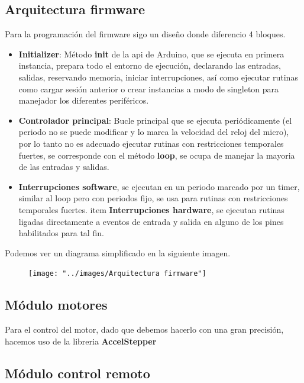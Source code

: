 \subsection{Arquitectura firmware}


Para la programación del firmware sigo un diseño donde diferencio 4 bloques.


\begin{itemize}
	\item \textbf{Initializer}: Método \textbf{init} de la api de Arduino, que se ejecuta en primera instancia, prepara todo el entorno de ejecución, declarando las entradas, salidas,  reservando memoria, iniciar interrupciones, así como ejecutar rutinas como cargar sesión anterior o crear instancias a modo de singleton para manejador los diferentes periféricos. 
	\item \textbf{Controlador principal}: Bucle principal que se ejecuta periódicamente (el periodo no se puede modificar y lo marca la velocidad del reloj del micro), por lo tanto no es adecuado ejecutar rutinas con restricciones temporales fuertes, se corresponde con el método \textbf{loop}, se ocupa de manejar la mayoria de las entradas y salidas.
	\item \textbf{Interrupciones software}, se ejecutan en un periodo marcado por un timer, similar al loop pero con periodos fijo, se usa para rutinas con restricciones temporales fuertes.
	item \textbf{Interrupciones hardware}, se ejecutan rutinas ligadas directamente a eventos de entrada y salida en alguno de los pines habilitados para tal fin. 
\end{itemize}

Podemos ver un diagrama simplificado en la siguiente imagen.

\begin{figure}
\centering
\texttt{[image: "../images/Arquitectura firmware"]}
\caption{}
\label{fig:Arquitecturafirmware}
\end{figure}

\subsection{Módulo motores}

Para el control del motor, dado que debemos hacerlo con una gran precisión, hacemos uso de la libreria 
\textbf{AccelStepper} \cite{accelstp} 

\subsection{Módulo control remoto}

